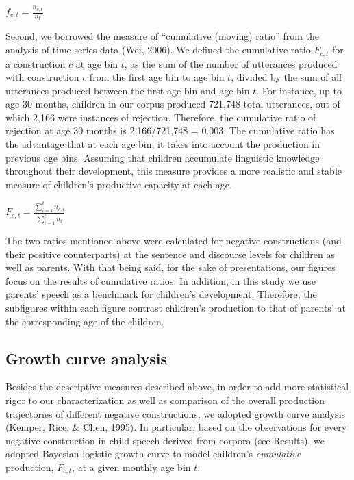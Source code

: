 \documentclass[
  english,
  man,floatsintext]{apa6}
\begin{document}
\(f_{c, t} = \frac{n_{c,t}}{n_{t}}\)

Second, we borrowed the measure of ``cumulative (moving) ratio'' from the analysis of time series data (Wei, 2006). We defined the cumulative ratio \(F_{c,t}\) for a construction \(c\) at age bin \(t\), as the sum of the number of utterances produced with construction \(c\) from the first age bin to age bin \(t\), divided by the sum of all utterances produced between the first age bin and age bin \(t\). For instance, up to age 30 months, children in our corpus produced 721,748 total utterances, out of which 2,166 were instances of rejection. Therefore, the cumulative ratio of rejection at age 30 months is 2,166/721,748 = 0.003. The cumulative ratio has the advantage that at each age bin, it takes into account the production in previous age bins. Assuming that children accumulate linguistic knowledge throughout their development, this measure provides a more realistic and stable measure of children's productive capacity at each age.

\(F_{c, t} = \frac{\sum_{i=1}^{t} n_{c,i}}{\sum_{i=1}^{t} n_{i}}\)

The two ratios mentioned above were calculated for negative constructions (and their positive counterparts) at the sentence and discourse levels for children as well as parents. With that being said, for the sake of presentations, our figures focus on the results of cumulative ratios. In addition, in this study we use parents' speech as a benchmark for children's development. Therefore, the subfigures within each figure contrast children's production to that of parents' at the corresponding age of the children.

\hypertarget{growth-curve-analysis}{%
\subsection{Growth curve analysis}\label{growth-curve-analysis}}

Besides the descriptive measures described above, in order to add more statistical rigor to our characterization as well as comparison of the overall production trajectories of different negative constructions, we adopted growth curve analysis (Kemper, Rice, \& Chen, 1995). In particular, based on the observations for every negative construction in child speech derived from corpora (see Results), we adopted Bayesian logistic growth curve to model children's \emph{cumulative} production, \(F_{c,t}\), at a given monthly age bin \(t\).
\end{document}
